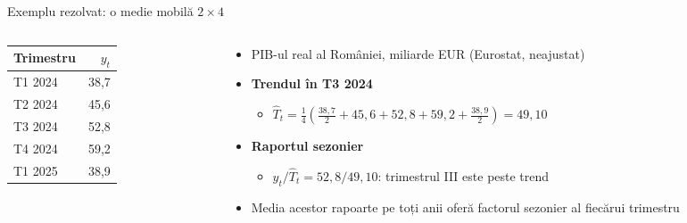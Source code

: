 \begin{frame}{Exemplu rezolvat: o medie mobilă $2 \times 4$}
\itemsize{\footnotesize}
\begin{columns}[T]
\begin{column}{0.32\textwidth}
\begin{center}
\footnotesize
\begin{tabular}{lr}
\toprule
\textbf{Trimestru} & \textbf{$y_t$} \\
\midrule
T1 2024 & 38{,}7 \\
T2 2024 & 45{,}6 \\
T3 2024 & 52{,}8 \\
T4 2024 & 59{,}2 \\
T1 2025 & 38{,}9 \\
\bottomrule
\end{tabular}
\end{center}

\end{column}
\begin{column}{0.64\textwidth}
\begin{itemize}
    \item PIB-ul real al României, miliarde EUR (Eurostat, neajustat)
    \item \textbf{Trendul în T3 2024}
    \begin{itemize}
        \item $\hat T_t = \frac{1}{4}\left(\frac{38{,}7}{2} + 45{,}6 + 52{,}8 + 59{,}2 + \frac{38{,}9}{2}\right) = 49{,}10$
    \end{itemize}
    \item \textbf{Raportul sezonier}
    \begin{itemize}
        \item $y_t / \hat T_t = 52{,}8 / 49{,}10$: trimestrul III este peste trend
    \end{itemize}
    \item Media acestor rapoarte pe toți anii oferă factorul sezonier al fiecărui trimestru
\end{itemize}
\end{column}
\end{columns}
\end{frame}

